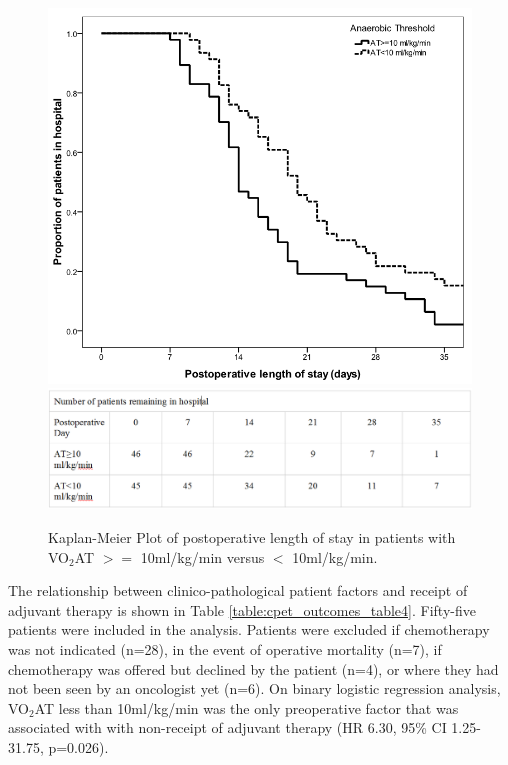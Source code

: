 

\begin{figure}[h]
\centering
\includegraphics[width=0.8\linewidth]{Figures/cpet_outcomes_km_at_los}
\includegraphics[width=1\linewidth]{Figures/cpet_outcomes_km_at_los_table} %
\caption{Kaplan-Meier Plot of postoperative length of stay in patients with VO$_2$AT $>=$ 10ml/kg/min versus $<$ 10ml/kg/min.}
\label{fig:cpet_outcomes_km_at_los}
\end{figure}

The relationship between clinico-pathological patient factors and receipt of adjuvant therapy is shown in Table \ref{table:cpet_outcomes_table4}. Fifty-five patients were included in the analysis. Patients were excluded if chemotherapy was not indicated (n=28), in the event of operative mortality (n=7), if chemotherapy was offered but declined by the patient (n=4), or where they had not been seen by an oncologist yet (n=6). On binary logistic regression analysis, VO$_2$AT less than 10ml/kg/min was the only preoperative factor that was associated with with non-receipt of adjuvant therapy (HR 6.30, 95\% CI 1.25-31.75, p=0.026). 



